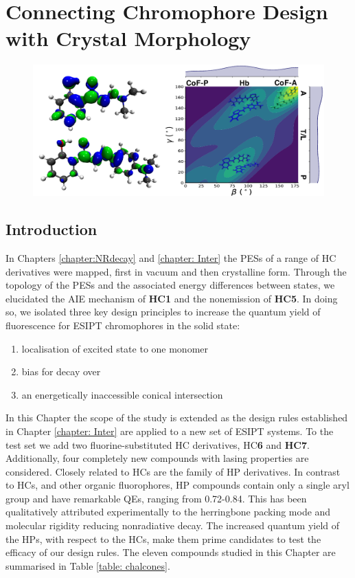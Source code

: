 \chapter[Connecting Chromophore Design with Crystal Morphology]{Connecting Chromophore Design with Crystal Morphology}
\label{chapter: Connecting}
\begin{figure}[H]
\centering
  \includegraphics[width=0.7\linewidth]{5ConnectingCrystalStructure/3toc.pdf}
\end{figure}
\section{Introduction}\label{section: Connecting_Introduction}

In Chapters \ref{chapter:NRdecay} and \ref{chapter: Inter} the \acp{PES} of a range of \ac{HC} derivatives were mapped, first in vacuum and then crystalline form. Through the topology of the PESs and the associated energy differences between states, we elucidated the AIE mechanism of \textbf{HC1} and the nonemission of \textbf{HC5}. In doing so, we isolated three key design principles to increase the quantum yield of fluorescence for ESIPT chromophores in the solid state:
\begin{enumerate}
    \item localisation of excited state to one monomer 
    \item bias for \Kstar{} decay over \Estar{}
    \item an energetically inaccessible conical intersection
\end{enumerate}

In this Chapter the scope of the study is extended as the design rules established in Chapter  \ref{chapter: Inter} are applied to a new set of ESIPT systems. To the test set we add two fluorine-substituted \ac{HC} derivatives, \ac{HC}\textbf{6} and \textbf{HC7}.\cite{Cheng2016} Additionally, four completely new compounds with lasing properties are considered. Closely related to \acp{HC} are the family of \ac{HP} derivatives.\cite{Tang2016} In contrast to \acp{HC}, and other organic fluorophores, \ac{HP} compounds contain only a single aryl group and have remarkable QEs, ranging from 0.72-0.84. This has been qualitatively attributed experimentally to the herringbone packing mode and molecular rigidity reducing nonradiative decay. The increased quantum yield of the \acp{HP}, with respect to the \acp{HC}, make them prime candidates to test the efficacy of our  design rules. The eleven compounds studied in this Chapter are summarised in Table \ref{table: chalcones}.

